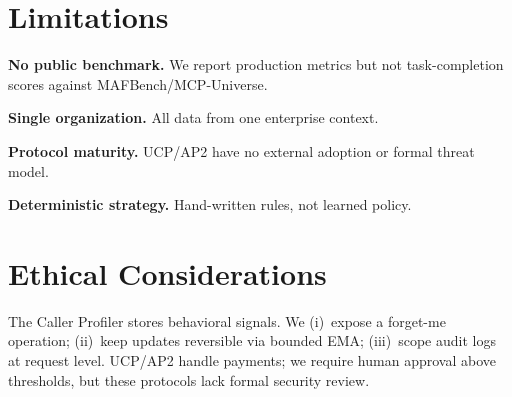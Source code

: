 \documentclass[11pt]{article}
\begin{document}
\section*{Limitations}

\textbf{No public benchmark.} We report production metrics but not task-completion scores against MAFBench/MCP-Universe.

\textbf{Single organization.} All data from one enterprise context.

\textbf{Protocol maturity.} UCP/AP2 have no external adoption or formal threat model.

\textbf{Deterministic strategy.} Hand-written rules, not learned policy.

\section*{Ethical Considerations}

The Caller Profiler stores behavioral signals. We (i)~expose a forget-me operation; (ii)~keep updates reversible via bounded EMA; (iii)~scope audit logs at request level. UCP/AP2 handle payments; we require human approval above thresholds, but these protocols lack formal security review.


\end{document}

